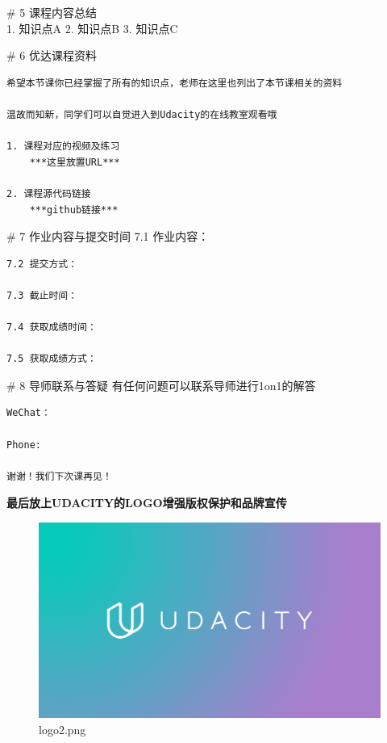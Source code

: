 \documentclass[11pt]{article}
\makeatletter
\def\maxwidth{\ifdim\Gin@nat@width>\linewidth\linewidth
    \else\Gin@nat@width\fi}
\let\Oldincludegraphics\includegraphics
\renewcommand{\includegraphics}[1]{\Oldincludegraphics[width=.8\maxwidth]{#1}}
\makeatother
\begin{document}
     \# 5 课程内容总结\\
1. 知识点A 2. 知识点B 3. 知识点C

     \# 6 优达课程资料

\begin{verbatim}
希望本节课你已经掌握了所有的知识点，老师在这里也列出了本节课相关的资料

温故而知新，同学们可以自觉进入到Udacity的在线教室观看哦

1. 课程对应的视频及练习 
    ***这里放置URL***

2. 课程源代码链接
    ***github链接***
\end{verbatim}

     \# 7 作业内容与提交时间 7.1 作业内容：

\begin{verbatim}
7.2 提交方式：

7.3 截止时间：

7.4 获取成绩时间：

7.5 获取成绩方式：
\end{verbatim}

     \# 8 导师联系与答疑 有任何问题可以联系导师进行1on1的解答

\begin{verbatim}
WeChat：

Phone:

谢谢！我们下次课再见！
\end{verbatim}

    \textbf{最后放上UDACITY的LOGO增强版权保护和品牌宣传}

    \begin{figure}
\centering
\includegraphics{img/logo2.jpg}
\caption{logo2.png}
\end{figure}


    
    
    
    
\end{document}
